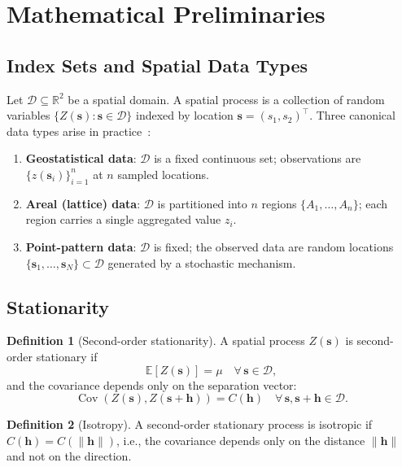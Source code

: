 \documentclass[conference]{IEEEtran}
\theoremstyle{definition}
\newtheorem{definition}{Definition}
\begin{document}
\section{Mathematical Preliminaries}
\label{sec:prelim}

\subsection{Index Sets and Spatial Data Types}

Let $\mathcal{D} \subseteq \mathbb{R}^2$ be a spatial domain. A spatial process is a collection of random variables $\{Z(\mathbf{s}) : \mathbf{s} \in \mathcal{D}\}$ indexed by location $\mathbf{s} = (s_1, s_2)^\top$. Three canonical data types arise in practice~\cite{cressie1993}:

\begin{enumerate}
  \item \textbf{Geostatistical data}: $\mathcal{D}$ is a fixed continuous set; observations are $\{z(\mathbf{s}_i)\}_{i=1}^n$ at $n$ sampled locations.
  \item \textbf{Areal (lattice) data}: $\mathcal{D}$ is partitioned into $n$ regions $\{A_1, \ldots, A_n\}$; each region carries a single aggregated value $z_i$.
  \item \textbf{Point-pattern data}: $\mathcal{D}$ is fixed; the observed data are random locations $\{\mathbf{s}_1, \ldots, \mathbf{s}_N\} \subset \mathcal{D}$ generated by a stochastic mechanism.
\end{enumerate}

\subsection{Stationarity}

\begin{definition}[Second-order stationarity]
A spatial process $Z(\mathbf{s})$ is second-order stationary if
\[
\mathbb{E}[Z(\mathbf{s})] = \mu \quad \forall\, \mathbf{s} \in \mathcal{D},
\]
and the covariance depends only on the separation vector:
\[
\operatorname{Cov}(Z(\mathbf{s}), Z(\mathbf{s} + \mathbf{h})) = C(\mathbf{h}) \quad \forall\, \mathbf{s}, \mathbf{s}+\mathbf{h} \in \mathcal{D}.
\]
\end{definition}

\begin{definition}[Isotropy]
A second-order stationary process is isotropic if $C(\mathbf{h}) = C(\|\mathbf{h}\|)$, i.e., the covariance depends only on the distance $\|\mathbf{h}\|$ and not on the direction.
\end{definition}
\end{document}
